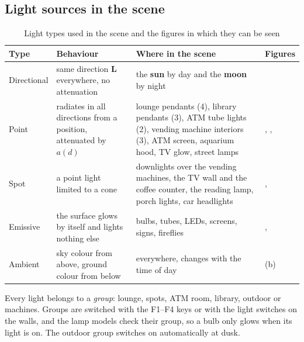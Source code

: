 \subsection{Light sources in the scene}
\begin{table}[H]
\centering\small
\caption{Light types used in the scene and the figures in which they can be seen}\label{tab:lighttypes}
\begin{tabularx}{\linewidth}{@{}P{1.8cm}P{3.4cm}XP{2.7cm}@{}}
\toprule
Type & Behaviour & Where in the scene & Figures \\ \midrule
Directional & same direction $\mathbf{L}$ everywhere, no attenuation & the \textbf{sun} by day and the \textbf{moon} by night &  \\
Point & radiates in all directions from a position, attenuated by $a(d)$ & lounge pendants (4), library pendants (3), ATM tube lights (2), vending machine interiors (3), ATM screen, aquarium hood, TV glow, street lamps & , ,  \\
Spot & a point light limited to a cone & downlights over the vending machines, the TV wall and the coffee counter, the reading lamp, porch lights, car headlights & ,  \\
Emissive & the surface glows by itself and lights nothing else & bulbs, tubes, LEDs, screens, signs, fireflies & ,  \\
Ambient & sky colour from above, ground colour from below & everywhere, changes with the time of day & (b) \\
\bottomrule
\end{tabularx}
\end{table}
Every light belongs to a \emph{group}: lounge, spots, ATM room, library, outdoor or machines. Groups are switched
with the F1--F4 keys or with the light switches on the walls, and the lamp models check their group, so a bulb only
glows when its light is on. The outdoor group switches on automatically at dusk.

